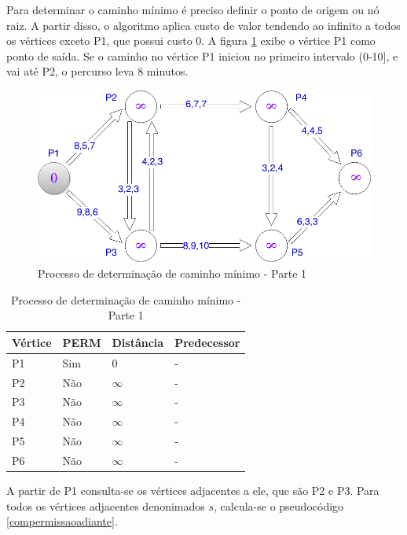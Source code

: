 Para determinar o caminho mínimo é preciso definir o ponto de origem ou nó raiz. A partir disso, o algoritmo
aplica custo de valor tendendo ao infinito a todos os vértices exceto P1, que possui custo 0. A figura \ref{fig:leo2} exibe
o vértice P1 como ponto de saída. Se o caminho no vértice P1 iniciou no primeiro intervalo (0-10], e vai
até P2, o percurso leva 8 minutos.

\begin{figure}[htbp]
\centering
 \includegraphics[width=.50\textwidth]{chapters/fig/leo2.png}
\caption{Processo de determinação de caminho mínimo - Parte 1}
\label{fig:leo2}
\end{figure}

\begin{table}[htbp]
	\centering
	\begin{tabular}{l l l l}
	\toprule
	Vértice & PERM & Distância & Predecessor\\
	\midrule
	P1 & Sim & 0 & - \\
	P2 & Não & $\infty$ & - \\
	P3 & Não & $\infty$ & - \\
	P4 & Não & $\infty$ & - \\
	P5 & Não & $\infty$ & - \\
	P6 & Não & $\infty$ & - \\
	\bottomrule
	\end{tabular}
\caption{Processo de determinação de caminho mínimo - Parte 1}
 \label{tab:leotab1}
\end{table}
\FloatBarrier

A partir de P1 consulta-se os vértices adjacentes a ele, que são P2 e P3. Para todos os vértices
adjacentes denonimados $s$, calcula-se o pseudocódigo \ref{compermissaoadiante}.


